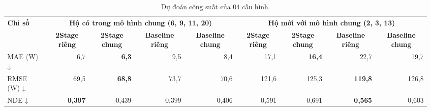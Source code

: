 \begin{table}[H]
\centering
\caption{Dự đoán công suất của 04 cấu hình.}\label{nilm:tab16}
\footnotesize
\setlength{\tabcolsep}{3.5pt}\renewcommand{\arraystretch}{1.12}
\begin{adjustbox}{max width=\linewidth}
\begin{tabular}{|l|r|r|r|r|r|r|r|r|}
\hline
\multirow{2}{*}{\textbf{Chỉ số}} & \multicolumn{4}{c|}{\textbf{Hộ có trong mô hình chung (6, 9, 11, 20)}} & \multicolumn{4}{c|}{\textbf{Hộ mới với mô hình chung (2, 3, 13)}} \\ \cline{2-9}
 & \multicolumn{1}{c|}{\textbf{2Stage riêng}} & \multicolumn{1}{c|}{\textbf{2Stage chung}} & \multicolumn{1}{c|}{\textbf{Baseline riêng}} & \multicolumn{1}{c|}{\textbf{Baseline chung}} & \multicolumn{1}{c|}{\textbf{2Stage riêng}} & \multicolumn{1}{c|}{\textbf{2Stage chung}} & \multicolumn{1}{c|}{\textbf{Baseline riêng}} & \multicolumn{1}{c|}{\textbf{Baseline chung}} \\ \hline
MAE (W) ↓ & 6,7 & \textbf{6,3} & 9,5 & 8,4 & 17,1 & \textbf{16,4} & 22,7 & 19,7 \\ \hline
RMSE (W) ↓ & 69,5 & \textbf{68,8} & 73,7 & 70,6 & 121,6 & 125,3 & \textbf{119,8} & 126,8 \\ \hline
NDE ↓ & \textbf{0,397} & 0,439 & 0,399 & 0,406 & 0,591 & 0,691 & \textbf{0,565} & 0,603 \\ \hline
\end{tabular}
\end{adjustbox}
\end{table}



